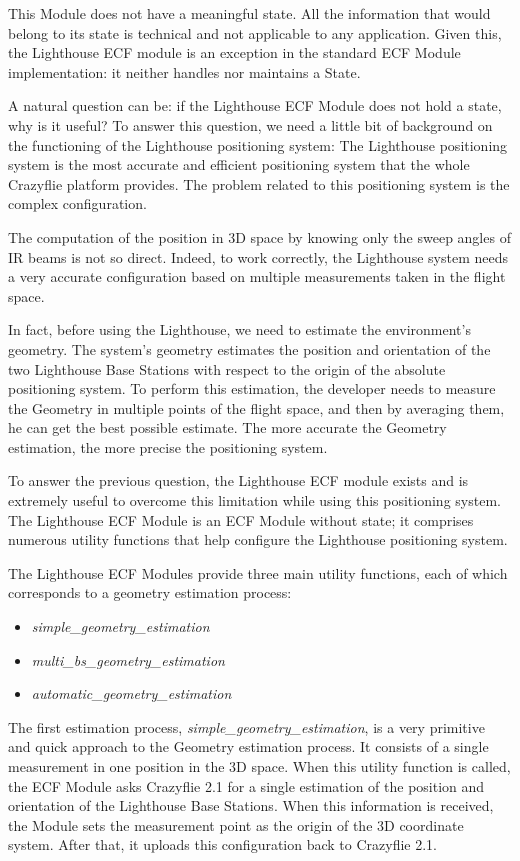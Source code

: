 This Module does not have a meaningful state. All the information that would belong to its state is technical and not applicable to any application.
Given this, the Lighthouse ECF module is an exception in the standard ECF Module implementation: it neither handles nor maintains a State.

A natural question can be: if the Lighthouse ECF Module does not hold a state, why is it useful?
To answer this question, we need a little bit of background on the functioning of the Lighthouse positioning system:
The Lighthouse positioning system is the most accurate and efficient positioning system that the whole Crazyflie platform provides. 
The problem related to this positioning system is the complex configuration.

The computation of the position in 3D space by knowing only the sweep angles of IR beams is not so direct. 
Indeed, to work correctly, the Lighthouse system needs a very accurate configuration based on multiple measurements taken in the flight space.

In fact, before using the Lighthouse, we need to estimate the environment's geometry. 
The system's geometry estimates the position and orientation of the two Lighthouse Base Stations with respect to the origin of the absolute positioning system.
To perform this estimation, the developer needs to measure the Geometry in multiple points of the flight space, and then by averaging them, he can get the best possible estimate.
The more accurate the Geometry estimation, the more precise the positioning system.

To answer the previous question, the Lighthouse ECF module exists and is extremely useful to overcome this limitation while using this positioning system.
The Lighthouse ECF Module is an ECF Module without state; it comprises numerous utility functions that help configure the Lighthouse positioning system.

The Lighthouse ECF Modules provide three main utility functions, each of which corresponds to a geometry estimation process:
\begin{itemize}
    \item \textit{simple\_geometry\_estimation}
    \item \textit{multi\_bs\_geometry\_estimation}
    \item \textit{automatic\_geometry\_estimation}
\end{itemize}
The first estimation process, \textit{simple\_geometry\_estimation}, is a very primitive and quick approach to the Geometry estimation process. 
It consists of a single measurement in one position in the 3D space. 
When this utility function is called, the ECF Module asks Crazyflie 2.1 for a single estimation of the position and orientation of the Lighthouse Base Stations.
When this information is received, the Module sets the measurement point as the origin of the 3D coordinate system. 
After that, it uploads this configuration back to Crazyflie 2.1.

